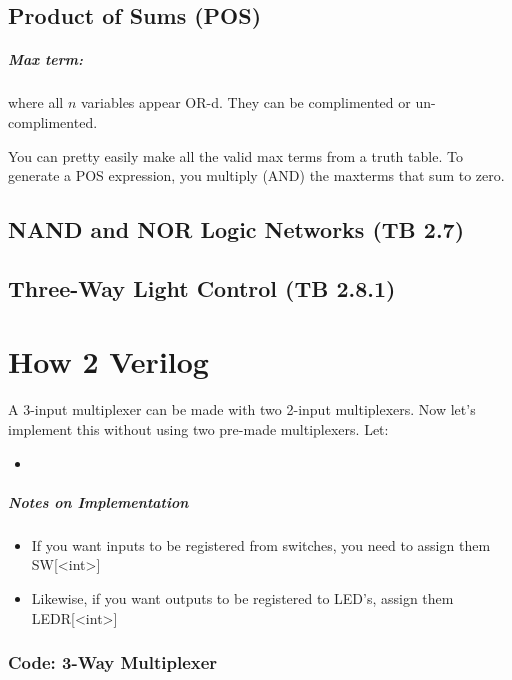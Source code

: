 \documentclass[a4paper,12pt]{report}
\begin{document}
\section{Product of Sums (POS)}
\paragraph{Max term: } where all $n$ variables appear OR-d. They can be complimented or
un-complimented. 

You can pretty easily make all the valid max terms from a truth table. To generate a POS
expression, you multiply (AND) the maxterms that sum to zero. 

\section{NAND and NOR Logic Networks (TB 2.7)}


\section{Three-Way Light Control (TB 2.8.1)}


\chapter{How 2 Verilog}
A 3-input multiplexer can be made with two 2-input multiplexers.
Now let's implement this without using two pre-made multiplexers. Let:
\begin{itemize}
\item 
\end{itemize}

\paragraph{Notes on Implementation}
\begin{itemize}
\item If you want inputs to be registered from switches, you need to assign them SW[<int>]
\item Likewise, if you want outputs to be registered to LED's, assign them LEDR[<int>]
\end{itemize}

\subsection{Code: 3-Way Multiplexer}

\end{document}
